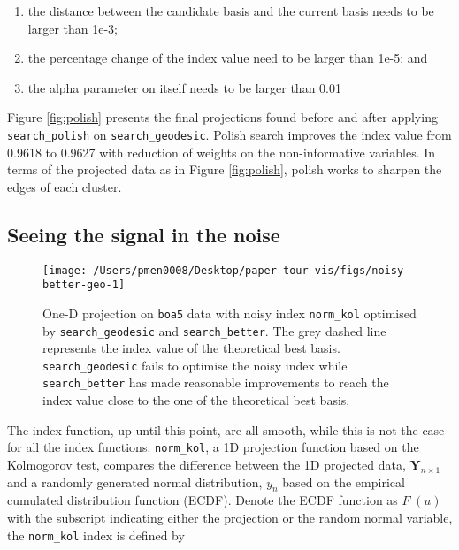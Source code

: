 \documentclass[12pt]{article}
\providecommand{\tightlist}{%
  \setlength{\itemsep}{0pt}\setlength{\parskip}{0pt}}
\begin{document}
\begin{enumerate}
\def\labelenumi{\arabic{enumi})}
\tightlist
\item
  the distance between the candidate basis and the current basis needs to be larger than 1e-3;
\item
  the percentage change of the index value need to be larger than 1e-5; and
\item
  the alpha parameter on itself needs to be larger than 0.01
\end{enumerate}

Figure \ref{fig:polish} presents the final projections found before and after applying \texttt{search\_polish} on \texttt{search\_geodesic}. Polish search improves the index value from 0.9618 to 0.9627 with reduction of weights on the non-informative variables. In terms of the projected data as in Figure \ref{fig:polish}, polish works to sharpen the edges of each cluster.

\hypertarget{seeing-the-signal-in-the-noise}{%
\subsection{Seeing the signal in the noise}\label{seeing-the-signal-in-the-noise}}

\begin{figure}

{\centering \texttt{[image: /Users/pmen0008/Desktop/paper-tour-vis/figs/noisy-better-geo-1]} 

}

\caption{One-D projection on \texttt{boa5} data with noisy index \texttt{norm\_kol} optimised by \texttt{search\_geodesic} and \texttt{search\_better}. The grey dashed line represents the index value of the theoretical best basis. \texttt{search\_geodesic} fails to optimise the noisy index while \texttt{search\_better} has made reasonable improvements to reach the index value close to the one of the theoretical best basis.}\label{fig:noisy-better-geo}
\end{figure}



The index function, up until this point, are all smooth, while this is not the case for all the index functions. \texttt{norm\_kol}, a 1D projection function based on the Kolmogorov test, compares the difference between the 1D projected data, \(\mathbf{Y}_{n \times 1}\) and a randomly generated normal distribution, \(y_n\) based on the empirical cumulated distribution function (ECDF). Denote the ECDF function as \(F_{.}(u)\) with the subscript indicating either the projection or the random normal variable, the \texttt{norm\_kol} index is defined by
\end{document}
